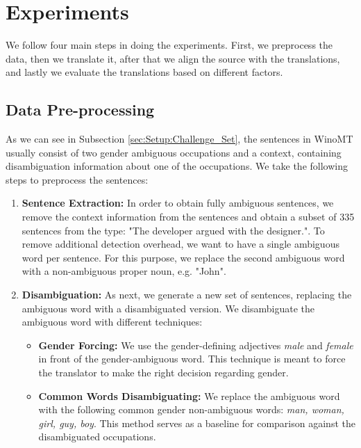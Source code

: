 \chapter{Experiments}
\label{ch:Experiments}


We follow four main steps in doing the experiments. First, we preprocess the data, then we translate it, after that we align the source with the translations, and lastly we evaluate the translations based on different factors.

\section{Data Pre-processing}
\label{sec:Experiments:Pre-processing}

As we can see in Subsection \ref{sec:Setup:Challenge_Set}, the sentences in WinoMT usually consist of two gender ambiguous occupations and a context, containing disambiguation information about one of the occupations. We take the following steps to preprocess the sentences:

\begin{enumerate}
  \item \textbf{Sentence Extraction:}  
  In order to obtain fully ambiguous sentences, we remove the context information from the sentences and obtain a subset of 335 sentences from the type: "The developer argued with the designer.".
  To remove additional detection overhead, we want to have a single ambiguous word per sentence. For this purpose, we replace the second ambiguous word with a non-ambiguous proper noun, e.g. "John". 
  \item \textbf{Disambiguation:} 
  As next, we generate a new set of sentences, replacing the ambiguous word with a disambiguated version. We disambiguate the ambiguous word with different techniques:
  \begin{itemize}
      \item \textbf{Gender Forcing:} We use the gender-defining adjectives \textit{male} and \textit{female} in front of the gender-ambiguous word. This technique is meant to force the translator to make the right decision regarding gender.
      \item \textbf{Common Words Disambiguating:} We replace the ambiguous word with the following common gender non-ambiguous words: \textit{man, woman, girl, guy, boy}. This method serves as a baseline for comparison against the disambiguated occupations.
  \end{itemize}
\end{enumerate}

